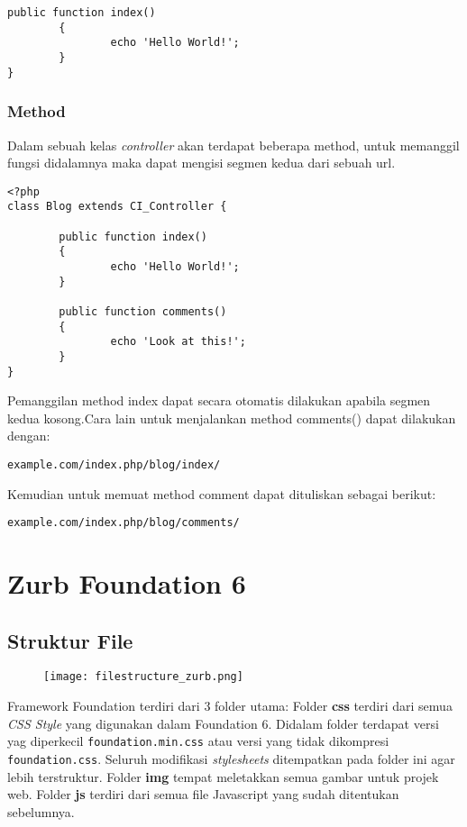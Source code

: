 \begin{enumerate}
\begin{lstlisting}[label=phpheg, frame=single]
        public function index()
        {
                echo 'Hello World!';
        }
}
\end{lstlisting} 

\subsubsection{Method}
\label{sssec:controller_1}
Dalam sebuah kelas \textit{controller} akan terdapat beberapa method, untuk memanggil fungsi didalamnya maka dapat mengisi segmen kedua dari sebuah url.
\begin{lstlisting}[label=phpheg, frame=single] 
<?php
class Blog extends CI_Controller {

        public function index()
        {
                echo 'Hello World!';
        }

        public function comments()
        {
                echo 'Look at this!';
        }
}
\end{lstlisting}

Pemanggilan method index dapat secara otomatis dilakukan apabila segmen kedua kosong.Cara lain untuk menjalankan method comments() dapat dilakukan dengan:
\begin{lstlisting}[frame=single] 
example.com/index.php/blog/index/
\end{lstlisting}

Kemudian untuk memuat method comment dapat dituliskan sebagai berikut:
\begin{lstlisting}[frame=single] 
example.com/index.php/blog/comments/
\end{lstlisting}

\section{Zurb Foundation 6}
\label{sec:zurb_foundation6}

\subsection{Struktur File}
\label{subs:strukturfile_zurb}
\begin{figure} [H]
	\centering  
	\texttt{[image: filestructure\_zurb.png]}  
	\label{fig:filestructure_zurb} 
\end{figure}

Framework Foundation terdiri dari 3 folder utama:
Folder \textbf{css} terdiri dari semua \textit{CSS Style} yang digunakan dalam Foundation 6. Didalam folder terdapat versi yag diperkecil \verb|foundation.min.css| atau versi yang tidak dikompresi \verb|foundation.css|. Seluruh modifikasi \textit{stylesheets} ditempatkan pada folder ini agar lebih terstruktur.
Folder \textbf{img} tempat meletakkan semua gambar untuk projek web.
Folder \textbf{js} terdiri dari semua file Javascript yang sudah ditentukan sebelumnya.


\end{enumerate}
